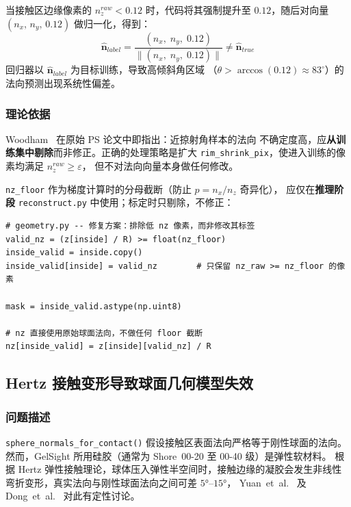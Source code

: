 \documentclass[12pt, a4paper]{ctexart}
\begin{document}
\begin{bugbox}
当接触区边缘像素的 $n_z^{raw} < 0.12$ 时，代码将其强制提升至 $0.12$，随后对向量
$(n_x,\, n_y,\, 0.12)$ 做归一化，得到：
\[
  \hat{\mathbf{n}}_{label}
  = \frac{(n_x,\; n_y,\; 0.12)}{\|(n_x,\; n_y,\; 0.12)\|}
  \neq \hat{\mathbf{n}}_{true}
\]
回归器以 $\hat{\mathbf{n}}_{label}$ 为目标训练，导致高倾斜角区域
（$\theta > \arccos(0.12) \approx 83^\circ$）的法向预测出现系统性偏差。
\end{bugbox}

\subsubsection*{理论依据}

Woodham~\cite{woodham1980photometric} 在原始 PS 论文中即指出：近掠射角样本的法向
不确定度高，应\textbf{从训练集中剔除}而非修正。正确的处理策略是扩大
\texttt{rim\_shrink\_pix}，使进入训练的像素均满足 $n_z^{raw} \geq \varepsilon$，
但不对法向向量本身做任何修改。

\begin{fixbox}
\texttt{nz\_floor} 作为梯度计算时的分母截断（防止 $p = n_x/n_z$ 奇异化），
应仅在\textbf{推理阶段} \texttt{reconstruct.py} 中使用；标定时只剔除，不修正：

\begin{lstlisting}
# geometry.py -- 修复方案：排除低 nz 像素，而非修改其标签
valid_nz = (z[inside] / R) >= float(nz_floor)
inside_valid = inside.copy()
inside_valid[inside] = valid_nz        # 只保留 nz_raw >= nz_floor 的像素

mask = inside_valid.astype(np.uint8)

# nz 直接使用原始球面法向，不做任何 floor 截断
nz[inside_valid] = z[inside][valid_nz] / R
\end{lstlisting}
\end{fixbox}

\subsection{Hertz 接触变形导致球面几何模型失效}
\label{subsec:hertz}

\subsubsection*{问题描述}

\texttt{sphere\_normals\_for\_contact()} 假设接触区表面法向严格等于刚性球面的法向。
然而，GelSight 所用硅胶（通常为 Shore~00-20 至 00-40 级）是弹性软材料。
根据 Hertz 弹性接触理论，球体压入弹性半空间时，接触边缘的凝胶会发生非线性
弯折变形，真实法向与刚性球面法向之间可差 $5°$--$15°$，
Yuan~et~al.~\cite{yuan2017gelsight} 及 Dong~et~al.~\cite{dong2017improved}
对此有定性讨论。
\end{document}
